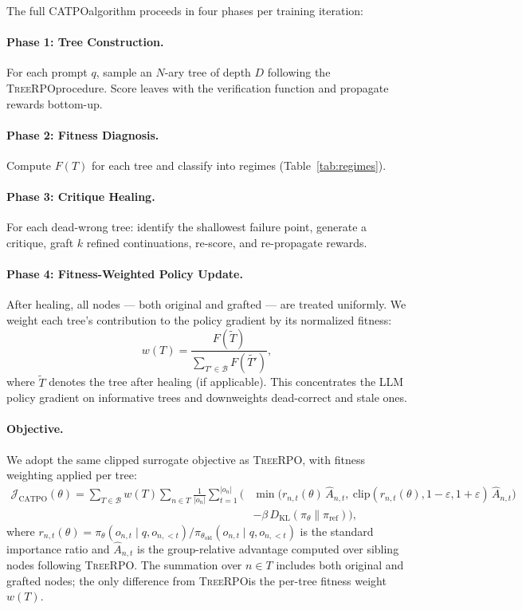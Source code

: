 \documentclass{article} %
\newcommand{\CATPO}{\textsc{CATPO}}
\newcommand{\TreeRPO}{\textsc{TreeRPO}}
\begin{document}
The full \CATPO algorithm proceeds in four phases per training iteration:

\paragraph{Phase 1: Tree Construction.} For each prompt $q$, sample an $N$-ary tree of depth $D$ following the \TreeRPO procedure. Score leaves with the verification function and propagate rewards bottom-up.

\paragraph{Phase 2: Fitness Diagnosis.} Compute $F(T)$ for each tree and classify into regimes (Table~\ref{tab:regimes}).

\paragraph{Phase 3: Critique Healing.} For each dead-wrong tree: identify the shallowest failure point, generate a critique, graft $k$ refined continuations, re-score, and re-propagate rewards.

\paragraph{Phase 4: Fitness-Weighted Policy Update.} After healing, all nodes --- both original and grafted --- are treated uniformly. We weight each tree's contribution to the policy gradient by its normalized fitness:
\begin{equation}
    w(T) = \frac{F(\tilde{T})}{\sum_{T' \in \mathcal{B}} F(\tilde{T'})},
    \label{eq:fitness_weight}
\end{equation}
where $\tilde{T}$ denotes the tree after healing (if applicable). This concentrates the LLM policy gradient on informative trees and downweights dead-correct and stale ones.

\paragraph{Objective.} We adopt the same clipped surrogate objective as \TreeRPO, with fitness weighting applied per tree:
\begin{equation}
\begin{aligned}
    \mathcal{J}_\text{CATPO}(\theta) = \sum_{T \in \mathcal{B}} w(T) \sum_{n \in T} \frac{1}{|o_n|} \sum_{t=1}^{|o_n|} \Big(
    &\min\big(r_{n,t}(\theta)\, \hat{A}_{n,t},\ \text{clip}(r_{n,t}(\theta), 1-\varepsilon, 1+\varepsilon)\, \hat{A}_{n,t}\big) \\
    &- \beta\, D_\text{KL}(\pi_\theta \| \pi_\text{ref}) \Big),
\end{aligned}
\label{eq:catpo_loss}
\end{equation}
where $r_{n,t}(\theta) = \pi_\theta(o_{n,t} \mid q, o_{n,<t}) / \pi_{\theta_\text{old}}(o_{n,t} \mid q, o_{n,<t})$ is the standard importance ratio and $\hat{A}_{n,t}$ is the group-relative advantage computed over sibling nodes following \TreeRPO. The summation over $n \in T$ includes both original and grafted nodes; the only difference from \TreeRPO is the per-tree fitness weight $w(T)$.
\end{document}
